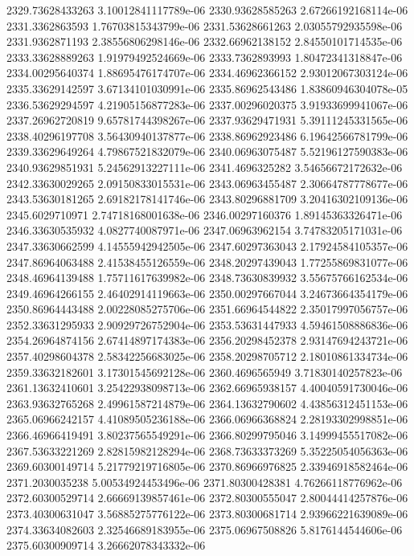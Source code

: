 {2329.73628433263 3.10012841117789e-06
2330.93628585263 2.67266192168114e-06
2331.3362863593 1.76703815343799e-06
2331.53628661263 2.03055792935598e-06
2331.9362871193 2.38556806298146e-06
2332.66962138152 2.84550101714535e-06
2333.33628889263 1.91979492524669e-06
2333.7362893993 1.80472341318847e-06
2334.00295640374 1.88695476174707e-06
2334.46962366152 2.93012067303124e-06
2335.33629142597 3.67134101030991e-06
2335.86962543486 1.83860946304078e-05
2336.53629294597 4.21905156877283e-06
2337.00296020375 3.91933699941067e-06
2337.26962720819 9.65781744398267e-06
2337.93629471931 5.39111245331565e-06
2338.40296197708 3.56430940137877e-06
2338.86962923486 6.19642566781799e-06
2339.33629649264 4.79867521832079e-06
2340.06963075487 5.52196127590383e-06
2340.93629851931 5.24562913227111e-06
2341.4696325282 3.54656672172632e-06
2342.33630029265 2.09150833015531e-06
2343.06963455487 2.30664787778677e-06
2343.53630181265 2.69182178141746e-06
2343.80296881709 3.20416302109136e-06
2345.6029710971 2.74718168001638e-06
2346.00297160376 1.89145363326471e-06
2346.33630535932 4.0827740087971e-06
2347.06963962154 3.74783205171031e-06
2347.33630662599 4.14555942942505e-06
2347.60297363043 2.17924584105357e-06
2347.86964063488 2.41538455126559e-06
2348.20297439043 1.77255869831077e-06
2348.46964139488 1.75711617639982e-06
2348.73630839932 3.55675766162534e-06
2349.46964266155 2.46402914119663e-06
2350.00297667044 3.24673664354179e-06
2350.86964443488 2.00228085275706e-06
2351.66964544822 2.35017997056757e-06
2352.33631295933 2.90929726752904e-06
2353.53631447933 4.59461508886836e-06
2354.26964874156 2.67414897174383e-06
2356.20298452378 2.93147694243721e-06
2357.40298604378 2.58342256683025e-06
2358.20298705712 2.18010861334734e-06
2359.33632182601 3.17301545692128e-06
2360.4696565949 3.71830140257823e-06
2361.13632410601 3.25422938098713e-06
2362.66965938157 4.40040591730046e-06
2363.93632765268 2.49961587214879e-06
2364.13632790602 4.43856312451153e-06
2365.06966242157 4.41089505236188e-06
2366.06966368824 2.28193302998851e-06
2366.46966419491 3.80237565549291e-06
2366.80299795046 3.14999455517082e-06
2367.53633221269 2.82815982128294e-06
2368.73633373269 5.35225054056363e-06
2369.60300149714 5.21779219716805e-06
2370.86966976825 2.33946918582464e-06
2371.2030035238 5.00534924453496e-06
2371.80300428381 4.76266118776962e-06
2372.60300529714 2.66669139857461e-06
2372.80300555047 2.80044414257876e-06
2373.40300631047 3.56885275776122e-06
2373.80300681714 2.93966221639089e-06
2374.33634082603 2.32546689183955e-06
2375.06967508826 5.8176144544606e-06
2375.60300909714 3.26662078343332e-06
}
